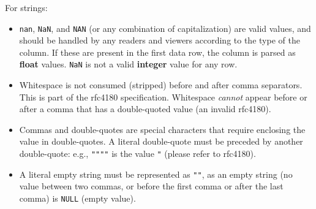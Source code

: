 For strings:
\begin{itemize}
\item \texttt{\small nan}, \texttt{\small NaN}, and \texttt{NAN} (or any
  combination of capitalization) are valid values, and should be handled
  by any readers and viewers according to the type of the column. If
  these are present in the first data row, the column is parsed as 
  \textbf{float} values. \texttt{\small NaN} is not a valid \textbf{integer}
  value for any row.
\item Whitespace is not consumed (stripped) before and after comma separators.
  This is part of the rfc4180 specification. Whitespace {\em cannot} appear
  before or after a comma that has a double-quoted value (an invalid rfc4180).
\item Commas and double-quotes are special characters that require 
  enclosing the value in double-quotes. A literal double-quote must be preceded 
  by another double-quote: e.g., \texttt{\small """"} is the value 
  \texttt{\small "} (please refer to rfc4180).
\item A literal empty string must be represented as \texttt{\small ""}, as an 
  empty string (no value between two commas, or before the first comma
  or after the last comma) is \texttt{\small NULL} (empty value).
\end{itemize}

